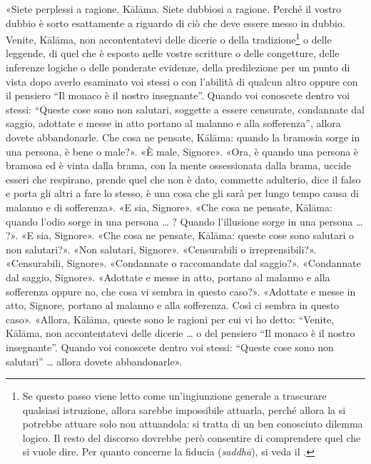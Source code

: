«Siete perplessi a ragione, Kālāma. Siete dubbiosi a ragione. Perché il
vostro dubbio è sorto esattamente a riguardo di ciò che deve essere
messo in dubbio. Venite, Kālāma, non accontentatevi delle dicerie o
della tradizione\footnote{Se questo passo viene letto come un’ingiunzione generale a trascurare qualsiasi istruzione, allora sarebbe impossibile attuarla, perché allora la si potrebbe attuare solo non attuandola: si tratta di un ben conosciuto dilemma logico. Il resto del discorso dovrebbe però consentire di comprendere quel che si vuole dire. Per quanto concerne la fiducia (\emph{saddhā}), si veda il \hyperlink{cap-11-La-persona#pag222}{}.} o delle leggende, di quel che è
esposto nelle vostre scritture o delle congetture, delle inferenze
logiche o delle ponderate evidenze, della predilezione per un punto di
vista dopo averlo esaminato voi stessi o con l’abilità di qualcun altro
oppure con il pensiero “Il monaco è il nostro insegnante”. Quando voi
conoscete dentro voi stessi: “Queste cose sono non salutari, soggette a
essere censurate, condannate dal saggio, adottate e messe in atto
portano al malanno e alla sofferenza”, allora dovete abbandonarle. Che
cosa ne pensate, Kālāma: quando la bramosia sorge in una persona, è bene
o male?». «È male, Signore». «Ora, è quando una persona è bramosa ed è
vinta dalla brama, con la mente ossessionata dalla brama, uccide esseri
che respirano, prende quel che non è dato, commette adulterio, dice il
falso e porta gli altri a fare lo stesso, è  una cosa che gli sarà per
lungo tempo causa di malanno e di sofferenza». «E sia, Signore». «Che
cosa ne pensate, Kālāma: quando l’odio sorge in una persona … ? Quando
l’illusione sorge in una persona … ?». «E sia, Signore». «Che cosa ne
pensate, Kālāma: queste cose sono salutari o non salutari?». «Non
salutari, Signore». «Censurabili o irreprensibili?». «Censurabili,
Signore». «Condannate o raccomandate dal saggio?». «Condannate dal
saggio, Signore». «Adottate e messe in atto, portano al malanno e alla
sofferenza oppure no, che cosa vi sembra in questo caso?». «Adottate e
messe in atto, Signore, portano al malanno e alla sofferenza. Così ci
sembra in questo caso». «Allora, Kālāma, queste sono le ragioni per cui
vi ho detto: “Venite, Kālāma, non accontentatevi delle dicerie … o del
pensiero “Il monaco è il nostro insegnante”. Quando voi conoscete dentro
voi stessi: “Queste cose sono non salutari” … allora dovete
abbandonarle».


